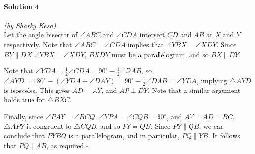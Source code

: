 \documentclass[10pt]{article}
\begin{document}
		\noindent \makebox[\linewidth]{\rule{\textwidth}{0.4pt}}
	
	\paragraph{Solution 4} \textit{(by Sharky Kesa)}\\
	
	\noindent Let the angle bisector of \(\angle ABC\) and \(\angle CDA\) intersect \(CD\) and \(AB\) at \(X\) and \(Y\) respectively. Note that \(\angle ABC = \angle CDA\) implies that \(\angle YBX = \angle XDY\). Since \(BY \parallel DX\) \(\angle YBX = \angle XDY\), \(BXDY\) must be a parallelogram, and so \(BX \parallel DY\). 
	
	  Note that \(\angle YDA = \frac{1}{2} \angle CDA = 90^{\circ} - \frac{1}{2} \angle DAB\), so \(\angle AYD = 180^{\circ} - (\angle YDA + \angle DAY) = 90^{\circ} - \frac{1}{2} \angle DAB = \angle YDA\), implying \(\triangle AYD\) is isosceles. This gives \(AD = AY\), and \(AP \perp DY\). Note that a similar argument holds true for \(\triangle BXC\).
	  
	  Finally, since \(\angle PAY = \angle BCQ\), \(\angle YPA = \angle CQB = 90^{\circ}\), and \(AY = AD = BC\), \(\triangle APY\) is congruent to \(\triangle CQB\), and so \(PY = QB\). Since \(PY \parallel QB\), we can conclude that \(PYBQ\) is a parallelogram, and in particular, \(PQ \parallel YB\). It follows that \(PQ \parallel AB\), as required.\hfill\ensuremath{\square}\\
	  
\end{document}
